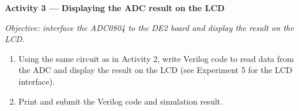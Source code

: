 \begin{procedure}
  \textbf{Activity 3 --- Displaying the ADC result on the LCD}\vspace{2pt}

  \textit{Objective: interface the ADC0804 to the DE2 board and display the result on the LCD.}

  \begin{enumerate}
    \item Using the same circuit as in Activity 2, write Verilog code to read data from the ADC and display the result on the LCD (see Experiment 5 for the LCD interface).
    \item Print and submit the Verilog code and simulation result.
  \end{enumerate}

\end{procedure}
